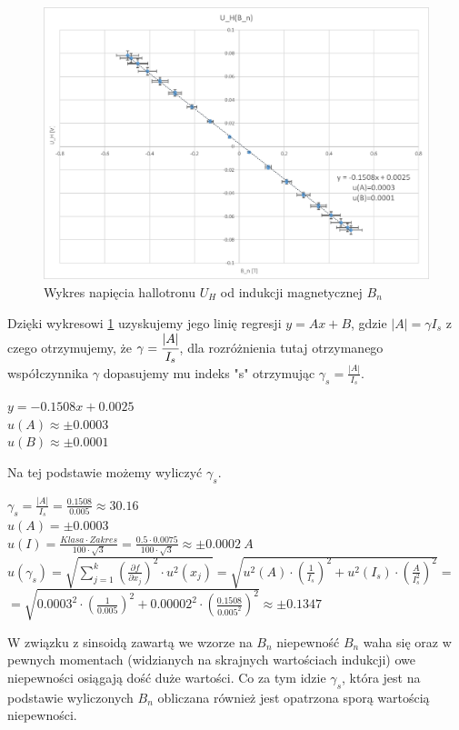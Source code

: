 \documentclass{article}
\begin{document}
\begin{figure}[h]
    \centering
    \includegraphics{U_H_od_B_n.png}
    \caption{Wykres napięcia hallotronu $U_{H}$ od indukcji magnetycznej $B_{n}$ }
    \label{fig: Wykres 3}
\end{figure}{}
Dzięki wykresowi \ref{fig: Wykres 3} uzyskujemy jego linię regresji $y=Ax+B$, gdzie $|A|=\gamma I_{s}$ z czego otrzymujemy, że $\gamma=\cfrac{|A|}{I_{s}}$, dla rozróżnienia tutaj otrzymanego współczynnika $\gamma$ dopasujemy mu indeks "s" otrzymując $\gamma_{s}=\frac{|A|}{I_{s}}$.
\begin{center}
    $y=-0.1508x+0.0025$\\
    $u(A)\approx\pm0.0003$\\
    $u(B)\approx\pm0.0001$
\end{center}{}
\newpage
Na tej podstawie możemy wyliczyć $\gamma_{s}$.
\begin{center}
    \vspace{2.5ex}
    $\gamma_{s}=\frac{|A|}{I_{s}}=\frac{0.1508}{0.005}\approx30.16$\\
    \vspace{2.5ex}
    $u(A)=\pm0.0003$\\
    \vspace{2.5ex}
    $u(I)=\frac{Klasa\cdot Zakres}{100\cdot \sqrt{3}}=\frac{0.5\cdot0.0075}{100\cdot \sqrt{3}}\approx\pm0.0002 \ A$\\
    \vspace{2.5ex}
    $u(\gamma_{s})=\sqrt{\sum^{k}_{j=1}\left(\frac{\partial f}{\partial x_{j}}\right)^{2}\cdot u^{2}(x_{j})}=\sqrt{u^{2}(A)\cdot\left(\frac{1}{I_{s}}\right)^{2}+u^{2}(I_{s})\cdot(\frac{A}{I_{s}^{2}})^{2}}=$\\
    \vspace{2.5ex}
    $=\sqrt{0.0003^{2}\cdot\left(\frac{1}{0.005}\right)^{2}+0.00002^{2}\cdot(\frac{0.1508}{0.005^{2}})^{2}}  \approx\pm0.1347$\\
    \vspace{2.5ex}
\end{center}
W związku z sinsoidą zawartą we wzorze na $B_{n}$ niepewność $B_{n}$ waha się oraz w pewnych momentach (widzianych na skrajnych wartościach indukcji) owe niepewności osiągają dość duże wartości. Co za tym idzie $\gamma_{s}$, która jest na podstawie wyliczonych $B_{n}$ obliczana również jest opatrzona sporą wartością niepewności.\\
\end{document}
